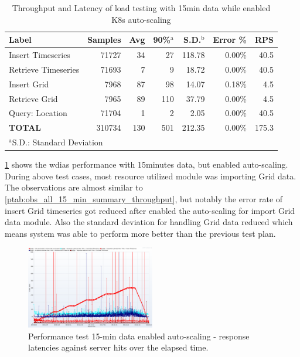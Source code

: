 \documentclass[conference]{IEEEtran}
\begin{document}
\begin{table}[tb!]
\caption{Throughput and Latency of load testing with 15min data while enabled K8s auto-scaling}
\begin{center}
\begin{adjustbox}{width=0.45\textwidth}
\footnotesize
\begin{tabular}{|l|r|r|r|r|r|r|}
\hline
\textbf{Label} & \textbf{Samples} & \textbf{Avg} & \textbf{90\%$^{\mathrm{a}}$} & \textbf{S.D.$^{\mathrm{b}}$} & \textbf{Error \%} & \textbf{RPS} \\ \hline
Insert Timeseries & 71727 & 34 & 27 & 118.78 & 0.00\% & 40.5 \\ \hline
Retrieve Timeseries & 71693 & 7 & 9 & 18.72 & 0.00\% & 40.5 \\ \hline
Insert Grid & 7968 & 87 & 98 & 14.07 & 0.18\% & 4.5 \\ \hline
Retrieve Grid & 7965 & 89 & 110 & 37.79 & 0.00\% & 4.5 \\ \hline
Query: Location & 71704 & 1 & 2 & 2.05 & 0.00\% & 40.5 \\ \hline
\textbf{TOTAL} & 310734 & 130 & 501 & 212.35 & 0.00\% & 175.3 \\ \hline
\multicolumn{4}{l}{$^{\mathrm{a}}$S.D.: Standard Deviation}{$^{\mathrm{b}}$90\%: 90\% percentile}
\end{tabular}
\end{adjustbox}
\label{ptab:obs_all_auto_15_min_summary_throughput}
\end{center}
\end{table}

\cref{ptab:obs_all_auto_15_min_summary_throughput} shows the \acrshort{wdias} performance with 15minutes data, but enabled auto-scaling. During above test cases, most resource utilized module was importing Grid data.
The observations are almost similar to \cref{ptab:obs_all_15_min_summary_throughput}, but notably the error rate of insert Grid timeseries got reduced after enabled the auto-scaling for import Grid data module. Also the standard deviation for handling Grid data reduced which means system was able to perform more better than the previous test plan.

\begin{figure}[b!]
\centerline{\includegraphics[width=0.5\textwidth]{results/obs/all_auto/obs_all_auto_15m_res_latencies_against_hits.png}}
\caption{Performance test 15-min data enabled auto-scaling - response latencies against server hits over the elapsed time.}
\label{pfi:test_obs_auto_all_15_min_latency_vs_hits}
\end{figure}
\end{document}
